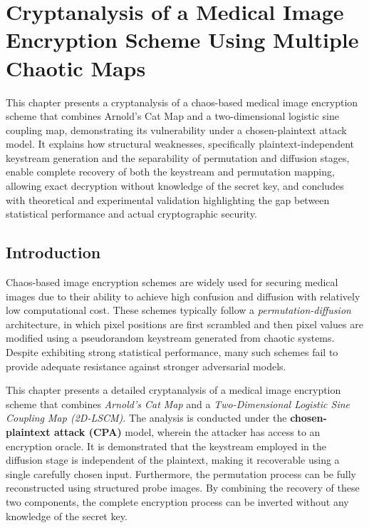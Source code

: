 
\chapter{Cryptanalysis of a Medical Image Encryption Scheme Using Multiple Chaotic Maps}

This chapter presents a cryptanalysis of a chaos-based medical image encryption scheme that combines Arnold's Cat Map and a two-dimensional logistic sine coupling map, demonstrating its vulnerability under a chosen-plaintext attack model. It explains how structural weaknesses, specifically plaintext-independent keystream generation and the separability of permutation and diffusion stages, enable complete recovery of both the keystream and permutation mapping, allowing exact decryption without knowledge of the secret key, and concludes with theoretical and experimental validation highlighting the gap between statistical performance and actual cryptographic security.

\section{Introduction}


Chaos-based image encryption schemes are widely used for securing medical images due to their ability to achieve high confusion and diffusion with relatively low computational cost. These schemes typically follow a \textit{permutation-diffusion} architecture, in which pixel positions are first scrambled and then pixel values are modified using a pseudorandom keystream generated from chaotic systems. Despite exhibiting strong statistical performance, many such schemes fail to provide adequate resistance against stronger adversarial models.

This chapter presents a detailed cryptanalysis of a medical image encryption scheme that combines \textit{Arnold's Cat Map} and a \textit{Two-Dimensional Logistic Sine Coupling Map (2D-LSCM)}. The analysis is conducted under the \textbf{chosen-plaintext attack (CPA)} model, wherein the attacker has access to an encryption oracle. It is demonstrated that the keystream employed in the diffusion stage is independent of the plaintext, making it recoverable using a single carefully chosen input. Furthermore, the permutation process can be fully reconstructed using structured probe images. By combining the recovery of these two components, the complete encryption process can be inverted without any knowledge of the secret key.

